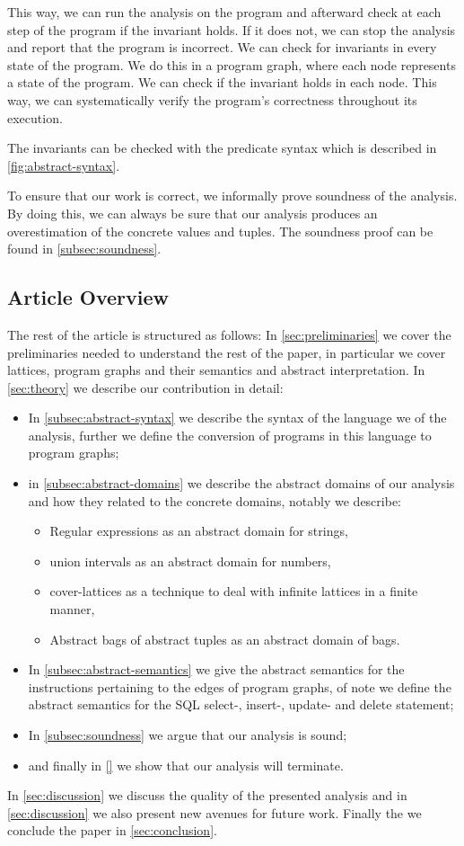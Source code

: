 This way, we can run the analysis on the program and afterward check at each step of the program if the invariant holds.
If it does not, we can stop the analysis and report that the program is incorrect.
We can check for invariants in every state of the program.
We do this in a program graph, where each node represents a state of the program.
We can check if the invariant holds in each node.
This way, we can systematically verify the program's correctness throughout its execution.

The invariants can be checked with the predicate syntax which is described in \autoref{fig:abstract-syntax}.

To ensure that our work is correct, we informally prove soundness of the analysis.
By doing this, we can always be sure that our analysis produces an overestimation of the concrete values and tuples.
The soundness proof can be found in \autoref{subsec:soundness}.

\subsection{Article Overview}\label{subsec:article-overview}
The rest of the article is structured as follows:
In \autoref{sec:preliminaries} we cover the preliminaries needed to understand the rest of the paper, in particular we cover lattices, program graphs and their semantics and abstract interpretation.
In \autoref{sec:theory} we describe our contribution in detail:

\begin{itemize}
    \item In \autoref{subsec:abstract-syntax} we describe the syntax of the language we of the analysis, further we define the conversion of programs in this language to program graphs;
    \item in \autoref{subsec:abstract-domains} we describe the abstract domains of our analysis and how they related to the concrete domains, notably we describe:
    \begin{itemize}
        \item Regular expressions as an abstract domain for strings,
        \item union intervals as an abstract domain for numbers,
        \item cover-lattices as a technique to deal with infinite lattices in a finite manner,
        \item Abstract bags of abstract tuples as an abstract domain of bags.
    \end{itemize}
    \item In \autoref{subsec:abstract-semantics} we give the abstract semantics for the instructions pertaining to the edges of program graphs, of note we define the abstract semantics for the SQL select-, insert-, update- and delete statement;
    \item In \autoref{subsec:soundness} we argue that our analysis is sound;
    \item and finally in \autoref{} we show that our analysis will terminate.
\end{itemize}

In \autoref{sec:discussion} we discuss the quality of the presented analysis and in \autoref{sec:discussion} we also present new avenues for future work.
Finally the we conclude the paper in \autoref{sec:conclusion}.




